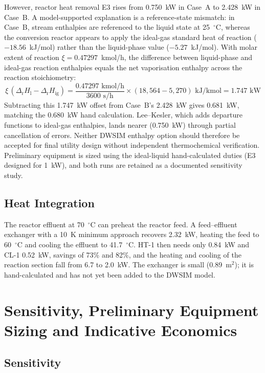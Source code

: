 \documentclass[10pt,a4paper]{article}
\begin{document}
However, reactor heat removal E3 rises from 0.750~kW in Case~A to 2.428~kW in Case~B. A model-supported explanation is a reference-state mismatch: in Case~B, stream enthalpies are referenced to the liquid state at 25~$^\circ$C, whereas the conversion reactor appears to apply the ideal-gas standard heat of reaction ($-18.56$~kJ/mol) rather than the liquid-phase value ($-5.27$~kJ/mol). With molar extent of reaction $\xi = 0.47297$~kmol/h, the difference between liquid-phase and ideal-gas reaction enthalpies equals the net vaporisation enthalpy across the reaction stoichiometry:
\begin{equation}
\xi\,(\Delta_{\mathrm{r}}H_{\mathrm{l}} - \Delta_{\mathrm{r}}H_{\mathrm{ig}}) = \frac{0.47297\text{ kmol/h}}{3600\text{ s/h}} \times (18{,}564 - 5{,}270)\text{ kJ/kmol} = 1.747\text{ kW}
\label{eq:offset}
\end{equation}
Subtracting this 1.747~kW offset from Case~B's 2.428~kW gives 0.681~kW, matching the 0.680~kW hand calculation. Lee--Kesler, which adds departure functions to ideal-gas enthalpies, lands nearer (0.750~kW) through partial cancellation of errors. Neither DWSIM enthalpy option should therefore be accepted for final utility design without independent thermochemical verification. Preliminary equipment is sized using the ideal-liquid hand-calculated duties (E3 designed for 1~kW), and both runs are retained as a documented sensitivity study.

\subsection{Heat Integration}
\label{sec:heat_int}

The reactor effluent at 70~$^\circ$C can preheat the reactor feed. A feed--effluent exchanger with a 10~K minimum approach recovers 2.32~kW, heating the feed to 60~$^\circ$C and cooling the effluent to 41.7~$^\circ$C. HT-1 then needs only 0.84~kW and CL-1 0.52~kW, savings of 73\% and 82\%, and the heating and cooling of the reaction section fall from 6.7 to 2.0~kW. The exchanger is small (0.89~m$^2$); it is hand-calculated and has not yet been added to the DWSIM model.

\section{Sensitivity, Preliminary Equipment Sizing and Indicative Economics}

\subsection{Sensitivity}
\end{document}
